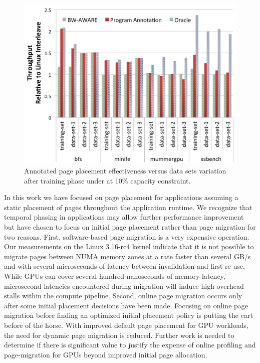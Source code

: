 \begin{figure}[t]
    \includegraphics[width=\columnwidth]{asplos2015/figures/sensitivitytotraining.png}
    \caption{Annotated page placement effectiveness versus data sets variation after training phase under at 10\% capacity constraint.}
    \label{fig:sensitivitytotraining}
\end{figure}

In this work we have focused on page placement for applications assuming a static
placement of pages throughout the application runtime. We recognize that temporal phasing in
applications may allow further performance improvement but have chosen to focus
on initial page placement rather than page migration for two reasons.  First,
software-based page migration is a very expensive operation.  Our measurements on the Linux 3.16-rc4 
kernel indicate that it is not possible to migrate pages between NUMA memory zones at a rate faster
than several GB/s and with several microseconds of latency between invalidation and first
re-use.  While GPUs can cover several hundred nanoseconds of memory latency, microsecond
latencies encountered during migration will induce high overhead stalls within the compute pipeline.
Second, online page migration occurs only after some initial placement decisions have been
made.  Focusing on online page migration before finding an optimized initial placement policy
is putting the cart before of the horse.  With improved default page placement
for GPU workloads, the need for dynamic page migration is reduced.  Further work is needed 
to determine if there is significant value to justify the expense of online profiling 
and page-migration for GPUs beyond improved initial page allocation.
